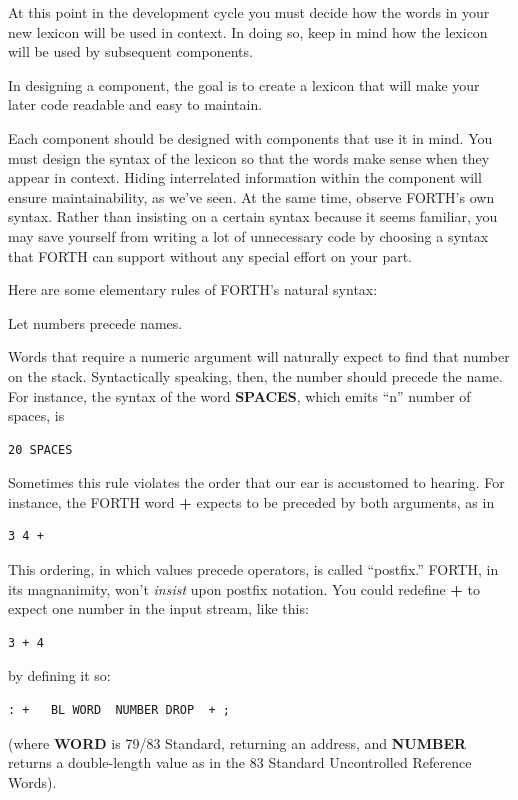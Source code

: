 At this point in the development cycle you must decide how the words in
your new lexicon will be used in context. In doing so, keep in mind how
the lexicon will be used by subsequent components.
\begin{tip}
In designing a component, the goal is to create a lexicon that will make your
later code readable and easy to maintain.
\end{tip}
Each component should be designed with components that use it in mind.
You must design the syntax of the lexicon so that the words make sense
when they appear in context. Hiding interrelated information within the
component will ensure maintainability, as we've seen.
At the same time, observe FORTH's own syntax. Rather than insisting
on a certain syntax because it seems familiar, you may save
yourself from writing a lot of unnecessary code by choosing a syntax that
FORTH can support without any special effort on your part.

Here are some elementary rules of FORTH's natural syntax:
\begin{tip}
Let numbers precede names.
\end{tip}
Words that require a numeric argument will naturally expect to find that
number on the stack. Syntactically speaking, then, the number should
precede the name. For instance, the syntax of the word \textbf{SPACES}, which
emits ``n'' number of spaces, is

\begin{verbatim}
20 SPACES
\end{verbatim}

Sometimes this rule violates the order that our ear is accustomed to
hearing. For instance, the FORTH word \textbf{+} expects to be preceded by both
arguments, as in

\begin{verbatim}
3 4 +
\end{verbatim}

This ordering, in which values precede operators, is called ``postfix.''
FORTH, in its magnanimity, won't \emph{insist} upon postfix notation.
You could redefine \textbf{+} to expect one number in the input stream, like this:

\begin{verbatim}
3 + 4
\end{verbatim}

by defining it so:
\begin{verbatim}
: +   BL WORD  NUMBER DROP  + ;
\end{verbatim}
(where \textbf{WORD} is 79/83 Standard, returning an address, and \textbf{NUMBER}
returns a double-length value as in the 83 Standard Uncontrolled
Reference Words).

